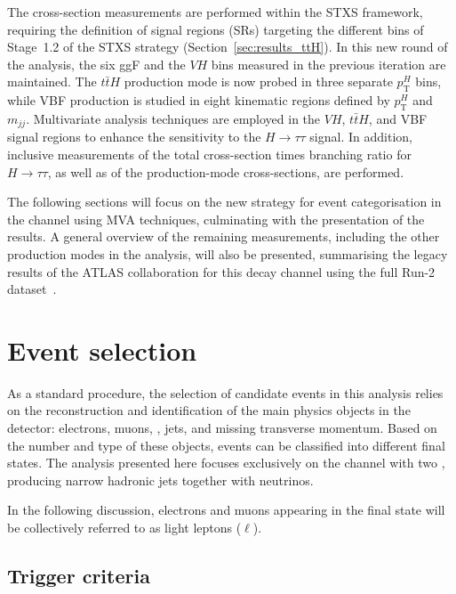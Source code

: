 The cross-section measurements are performed within the STXS framework, requiring the definition of signal regions (SRs) targeting the different bins of Stage~1.2 of the STXS strategy (Section~\ref{sec:results_ttH}). In this new round of the \htautau analysis, the six ggF and the $VH$ bins measured in the previous iteration are maintained. The $t\bar{t}H$ production mode is now probed in three separate $p_{\text{T}}^H$ bins, while VBF production is studied in eight kinematic regions defined by $p_{\text{T}}^H$ and $m_{jj}$. Multivariate analysis techniques are employed in the $VH$, $t\bar{t}H$, and VBF signal regions to enhance the sensitivity to the $H \to \tau\tau$ signal. In addition, inclusive measurements of the total cross-section times branching ratio for $H \to \tau\tau$, as well as of the production-mode cross-sections, are performed.  

The following sections will focus on the new strategy for event categorisation in the \ttH channel using MVA techniques, culminating with the presentation of the \ttHtt results. A general overview of the remaining measurements, including the other production modes in the \htautau analysis, will also be presented, summarising the legacy results of the ATLAS collaboration for this decay channel using the full Run-2 dataset~\cite{differential_htautau}.

\section{Event selection}
\label{sec:object_definiton}

As a standard procedure, the selection of candidate events in this analysis relies on the reconstruction and identification of the main physics objects in the detector: electrons, muons, \tauhad, jets, and missing transverse momentum. Based on the number and type of these objects, events can be classified into different final states. The analysis presented here focuses exclusively on the channel with two \tauhad, producing narrow hadronic jets together with neutrinos.  

In the following discussion, electrons and muons appearing in the final state will be collectively referred to as light leptons ($\ell$).

\subsection{Trigger criteria}
\label{subsec:trigger_tth}

